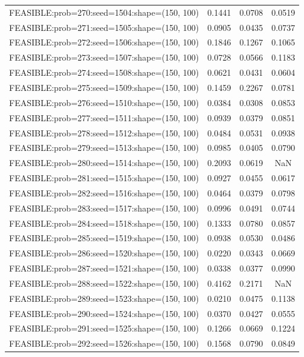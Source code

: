 \begin{longtable}{lccc}
FEASIBLE:prob=270:seed=1504:shape=(150, 100) & 0.1441 & 0.0708 & 0.0519 \\
FEASIBLE:prob=271:seed=1505:shape=(150, 100) & 0.0905 & 0.0435 & 0.0737 \\
FEASIBLE:prob=272:seed=1506:shape=(150, 100) & 0.1846 & 0.1267 & 0.1065 \\
FEASIBLE:prob=273:seed=1507:shape=(150, 100) & 0.0728 & 0.0566 & 0.1183 \\
FEASIBLE:prob=274:seed=1508:shape=(150, 100) & 0.0621 & 0.0431 & 0.0604 \\
FEASIBLE:prob=275:seed=1509:shape=(150, 100) & 0.1459 & 0.2267 & 0.0781 \\
FEASIBLE:prob=276:seed=1510:shape=(150, 100) & 0.0384 & 0.0308 & 0.0853 \\
FEASIBLE:prob=277:seed=1511:shape=(150, 100) & 0.0939 & 0.0379 & 0.0851 \\
FEASIBLE:prob=278:seed=1512:shape=(150, 100) & 0.0484 & 0.0531 & 0.0938 \\
FEASIBLE:prob=279:seed=1513:shape=(150, 100) & 0.0985 & 0.0405 & 0.0790 \\
FEASIBLE:prob=280:seed=1514:shape=(150, 100) & 0.2093 & 0.0619 &    NaN \\
FEASIBLE:prob=281:seed=1515:shape=(150, 100) & 0.0927 & 0.0455 & 0.0617 \\
FEASIBLE:prob=282:seed=1516:shape=(150, 100) & 0.0464 & 0.0379 & 0.0798 \\
FEASIBLE:prob=283:seed=1517:shape=(150, 100) & 0.0996 & 0.0491 & 0.0744 \\
FEASIBLE:prob=284:seed=1518:shape=(150, 100) & 0.1333 & 0.0780 & 0.0857 \\
FEASIBLE:prob=285:seed=1519:shape=(150, 100) & 0.0938 & 0.0530 & 0.0486 \\
FEASIBLE:prob=286:seed=1520:shape=(150, 100) & 0.0220 & 0.0343 & 0.0669 \\
FEASIBLE:prob=287:seed=1521:shape=(150, 100) & 0.0338 & 0.0377 & 0.0990 \\
FEASIBLE:prob=288:seed=1522:shape=(150, 100) & 0.4162 & 0.2171 &    NaN \\
FEASIBLE:prob=289:seed=1523:shape=(150, 100) & 0.0210 & 0.0475 & 0.1138 \\
FEASIBLE:prob=290:seed=1524:shape=(150, 100) & 0.0370 & 0.0427 & 0.0555 \\
FEASIBLE:prob=291:seed=1525:shape=(150, 100) & 0.1266 & 0.0669 & 0.1224 \\
FEASIBLE:prob=292:seed=1526:shape=(150, 100) & 0.1568 & 0.0790 & 0.0849 \\

\end{longtable}
